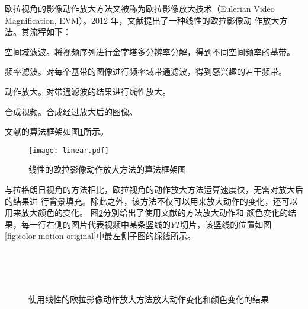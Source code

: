 欧拉视角的影像动作放大方法又被称为欧拉影像放大技术（Eulerian Video
Magnification, EVM）。2012 年，文献\cite{wu2012eulerian}提出了一种线性的欧拉影像动
作放大方法。其流程如下：

\begin{compactenum}
\item 空间域滤波。将视频序列进行金字塔多分辨率分解，得到不同空间频率的基带。
\item 频率滤波。对每个基带的图像进行频率域带通滤波，得到感兴趣的若干频带。
\item 动作放大。对带通滤波的结果进行线性放大。
\item 合成视频。合成经过放大后的图像。
\end{compactenum}

文献\cite{wu2012eulerian}的算法框架如图\ref{fig:linear}所示。

\begin{figure}[htbp]
  \centering
  \texttt{[image: linear.pdf]}
  \caption{线性的欧拉影像动作放大方法的算法框架图}
  \label{fig:linear}
\end{figure}

与拉格朗日视角的方法相比，欧拉视角的动作放大方法运算速度快，无需对放大后的结果进
行背景填充。除此之外，该方法不仅可以用来放大动作的变化，还可以用来放大颜色的变化。
图\ref{fig:color-motion}分別给出了使用文献\cite{wu2012eulerian}的方法放大动作和
颜色变化的结果，每一行右侧的图片代表视频中某条竖线的$YT$切片，该竖线的位置如图
\ref{fig:color-motion-original}中最左侧子图的绿线所示。

\begin{figure}[htbp]
  \centering
    \\
    \\
    \\
  \caption{使用线性的欧拉影像动作放大方法放大动作变化和颜色变化的结果}
  \label{fig:color-motion}
\end{figure}

